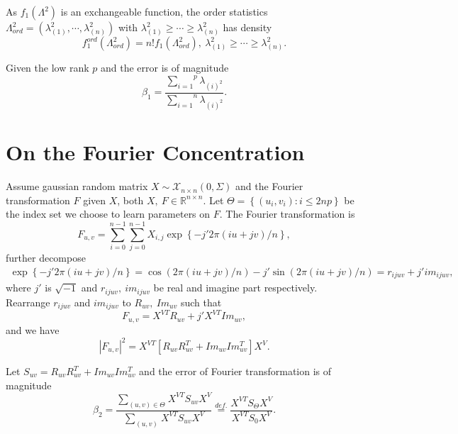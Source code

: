 \documentclass[12pt, a4paper, oneside]{article}
\begin{document}
    As $f_1(\Lambda^2)$ is an exchangeable function, the order statistics $\Lambda_{ord}^2=(\lambda_{(1)}^2,\cdots,\lambda_{(n)}^2)$ with $\lambda_{(1)}^2\geq\cdots\geq\lambda_{(n)}^2$ has density
    \begin{equation*}
        f_1^{ord}(\Lambda_{ord}^2)=n!f_1(\Lambda_{ord}^2),\ \lambda_{(1)}^2\geq\cdots\geq\lambda_{(n)}^2.
    \end{equation*}


    Given the low rank $p$ and the error is of magnitude
    \begin{equation*}
        \beta_1=\dfrac{\overset{p}{\underset{i=1}\sum}\lambda_{(i)^2}}{\overset{n}{\underset{i=1}\sum}\lambda_{(i)^2}}.
    \end{equation*}


\section{On the Fourier Concentration}
    Assume gaussian random matrix $X\sim\mathcal{X}_{n\times n}(0,\Sigma)$ and the Fourier transformation $F$ given $X$, both $X,\ F\in\mathbb{R}^{n\times n}$. Let $\Theta=\left\{ (u_i,v_i):i\leq 2np \right\}$ be the index set we choose to learn parameters on $F$. The Fourier transformation is
    \begin{equation*}
        F_{u,v}=\overset{n-1}{\underset{i=0}\sum}\overset{n-1}{\underset{j=0}\sum}X_{i,j}\exp\left\{ -j'2\pi(iu+jv)/n \right\},
    \end{equation*}
    further decompose
    \begin{align*}
        \exp\left\{ -j'2\pi(iu+jv)/n \right\}=\cos\left( 2\pi(iu+jv)/n \right)-j'\sin\left( 2\pi(iu+jv)/n \right)=r_{ijuv}+j'im_{ijuv},
    \end{align*}
    where $j'$ is $\sqrt{-1}$ and $r_{ijuv},\ im_{ijuv}$ be real and imagine part respectively. Rearrange $r_{ijuv}$ and $im_{ijuv}$ to $R_{uv},\ Im_{uv}$ such that
    \begin{equation*}
        F_{u,v}=X^{VT}R_{uv}+j'X^{VT}Im_{uv},
    \end{equation*}
    and we have
    \begin{equation*}
        |F_{u,v}|^2=X^{VT}\left[ R_{uv}R_{uv}^T+Im_{uv}Im_{uv}^T \right]X^V.
    \end{equation*}


    Let $S_{uv}=R_{uv}R_{uv}^T+Im_{uv}Im_{uv}^T$ and the error of Fourier transformation is of magnitude
    \begin{equation*}
        \beta_2=\dfrac{\overset{}{\underset{(u,v)\in\Theta}\sum}X^{VT}S_{uv}X^V}{\overset{}{\underset{(u,v)}\sum}X^{VT}S_{uv}X^V}\overset{def.}{=}\dfrac{X^{VT}S_{\Theta}X^V}{X^{VT}S_0X^V}.
    \end{equation*}
\end{document}
